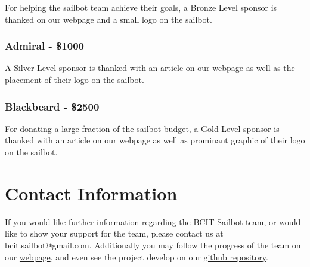 \documentclass{article}
\begin{document}
For helping the sailbot team achieve their goals, a Bronze Level sponsor is
thanked on our webpage and a small logo on the sailbot.

\subsubsection*{Admiral - \$1000}

A Silver Level sponsor is thanked with an article on our webpage as well as
the placement of their logo on the sailbot.

\subsubsection*{Blackbeard - \$2500}

For donating a large fraction of the sailbot budget, a Gold Level sponsor is
thanked with an article on our webpage as well as prominant graphic of their
logo on the sailbot.

\section*{Contact Information}

If you would like further information regarding the BCIT Sailbot team, or
would like to show your support for the team, please contact us at
bcit.sailbot@gmail.com. Additionally you may follow the progress of the team
on our \href{http://ieeebcit.org}{webpage}, and even see the project develop
on our \href{https://github.com/matt1795/BCIT-Sailbot}{github repository}.
\end{document}
